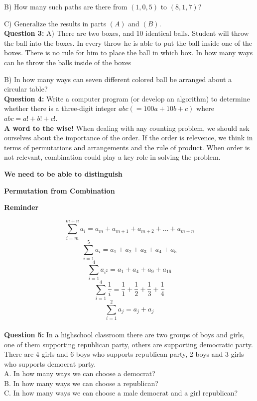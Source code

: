 \documentclass[11pt]{article}
\begin{document}
B) How many such paths are there from $(1,0,5)$ to $(8,1,7)$?

C) Generalize the results in parts $(A)$ and $(B)$.
\\

\textbf{Question 3:} A) There are two boxes, and 10 identical balls. Student will throw the 
ball into the boxes. In every throw he is able to put the ball inside one of the boxes. There 
is no rule for him to place the ball in which box. In how many ways can he throw the balls 
inside of the boxes %

B) In how many ways can seven different colored ball be arranged about a circular table? 
\\ %

\textbf{Question 4:}  Write a computer program (or develop an algorithm) to determine whether there is a three-digit integer $abc (= 100a + 10b + c)$ where $abc = a! + b! + c!$.
\\ %

\textbf{A word to the wise!} When dealing with any counting problem, we should ask 
ourselves about the importance of the order. If the order is relevence, we think in terms of 
permutations and arrangements and the rule of product. When order is not relevant, 
combination could play a key role in solving the problem.
\\

\begin{center}
\textbf{We need to be able to distinguish}

\textbf{Permutation from Combination}
\end{center}


\begin{center}
\textbf{Reminder}
\end{center}

$$\sum\limits_{i = m}^{m+n}{a_i = a_m+a_{m+1}+a_{m+2}+...+a_{m+n}}$$
$$\sum\limits_{i = 1}^5{a_i = a_1+a_2+a_3+a_4+a_5}$$
$$\sum\limits_{i = 1}^4{a_{i^2} = a_1+a_4+a_9+a_{16}}$$
$$\sum\limits_{i = 1}^4{\frac{1}{i} =\frac{1}{1}+\frac{1}{2}+\frac{1}{3}+\frac{1}{4}}$$
$$\sum\limits_{i = 1}^2{a_j = a_j+a_j}$$
\\

\textbf{Question 5:} In a highschool classroom there are two groups of boys and girls, one of 
them supporting republican party, others are supporting democratic party. There are 4 girls 
and 6 boys who supports republican party, 2 boys and 3 girls who supports democrat 
party.\\ %
A. In how many ways we can choose a democrat?\\
B. In how many ways we can choose a republican?\\
C. In how many ways we can choose a male democrat and a girl republican?\\
\\
\end{document}
